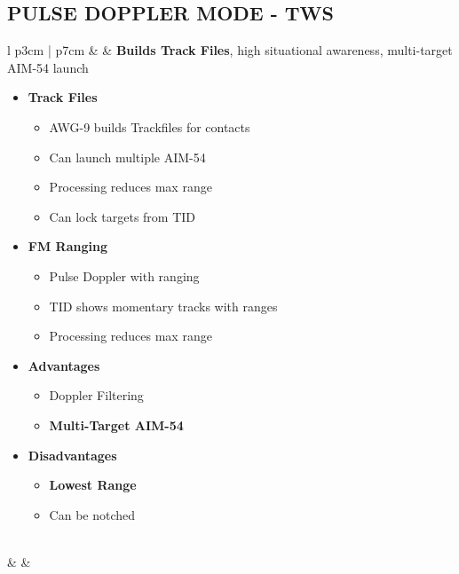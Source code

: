 \documentclass[8pt,usenames,dvipsnames,twoside]{article}
\begin{document}
		\subsection{PULSE DOPPLER MODE - TWS}
		\label{sec:awg9-tws}
		\begin{center}
			\begin{longtable}{l p{3cm} | p{7cm}}
				\toprule
				\textbullet &  & \textbf{Builds Track Files}, high situational awareness, multi-target AIM-54 launch
				
				\begin{minipage}[t]{\linewidth}
					\vspace{-7pt}
					\begin{itemize}
						\item \textbf{Track Files}
						\begin{itemize}
							\item AWG-9 builds Trackfiles for contacts
							\item Can launch multiple AIM-54 
							\item Processing reduces max range
							\item Can lock targets from TID
						\end{itemize}
						\item \textbf{FM Ranging}
						\begin{itemize}
							\item Pulse Doppler with ranging
							\item TID shows momentary tracks with ranges
							\item Processing reduces max range
						\end{itemize}
						\item \textbf{Advantages}
						\begin{itemize}
							\item Doppler Filtering
							\item \textbf{Multi-Target AIM-54}
						\end{itemize}
						\item \textbf{Disadvantages}
						\begin{itemize}
							\item \textbf{Lowest Range}
							\item Can be notched
						\end{itemize}
					\end{itemize}
				\end{minipage} \\
				\midrule
				\textbullet &  & 

\end{longtable}
\end{center}
\end{document}
